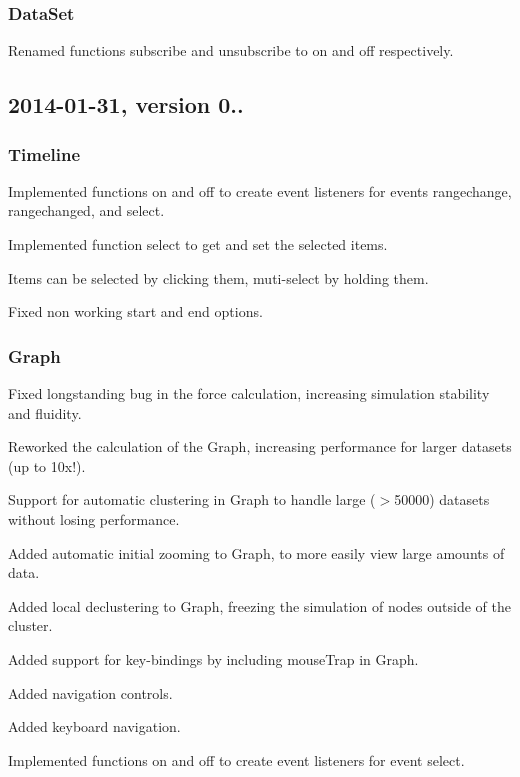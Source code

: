 \subsubsection*{Data\+Set}


\begin{DoxyItemize}
\item Renamed functions {\ttfamily subscribe} and {\ttfamily unsubscribe} to {\ttfamily on} and {\ttfamily off} respectively.
\end{DoxyItemize}

\subsection*{2014-\/01-\/31, version 0..}

\subsubsection*{Timeline}


\begin{DoxyItemize}
\item Implemented functions {\ttfamily on} and {\ttfamily off} to create event listeners for events {\ttfamily rangechange}, {\ttfamily rangechanged}, and {\ttfamily select}.
\item Implemented function {\ttfamily select} to get and set the selected items.
\item Items can be selected by clicking them, muti-\/select by holding them.
\item Fixed non working {\ttfamily start} and {\ttfamily end} options.
\end{DoxyItemize}

\subsubsection*{Graph}


\begin{DoxyItemize}
\item Fixed longstanding bug in the force calculation, increasing simulation stability and fluidity.
\item Reworked the calculation of the Graph, increasing performance for larger datasets (up to 10x!).
\item Support for automatic clustering in Graph to handle large ($>$50000) datasets without losing performance.
\item Added automatic initial zooming to Graph, to more easily view large amounts of data.
\item Added local declustering to Graph, freezing the simulation of nodes outside of the cluster.
\item Added support for key-\/bindings by including mouse\+Trap in Graph.
\item Added navigation controls.
\item Added keyboard navigation.
\item Implemented functions {\ttfamily on} and {\ttfamily off} to create event listeners for event {\ttfamily select}.
\end{DoxyItemize}

